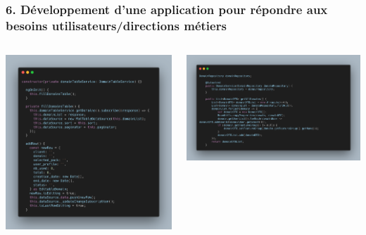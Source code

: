 \documentclass[aspectratio=169]{beamer}
\begin{document}
\begin{frame}
  \frametitle{6. Développement d’une application pour répondre aux besoins utilisateurs/directions métiers}
  \begin{columns}
    \begin{column}{0.5\textwidth}
      \includegraphics[height=0.50\textheight, center]{Imgs/js-code.png}
    \end{column}
    \begin{column}{0.5\textwidth}
      \includegraphics[height=0.50\textheight, center]{Imgs/java-code.png}
    \end{column}
  \end{columns}
\end{frame}
\end{document}
